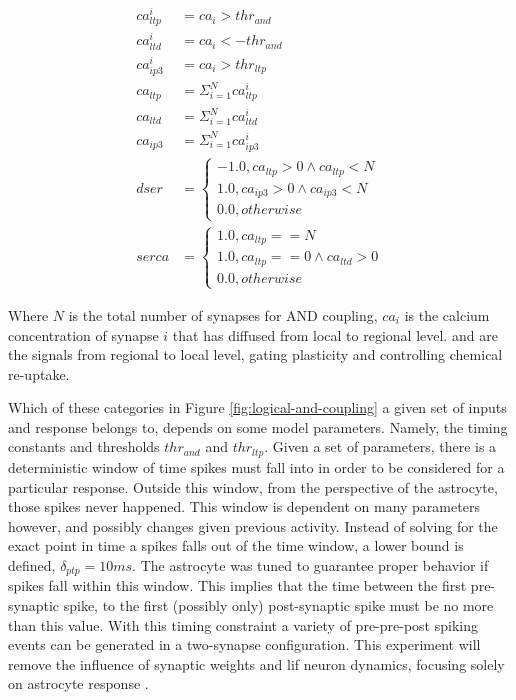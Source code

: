 \begin{align}
  ca^i_{ltp} &= ca_i > thr_{and} \label{eq:ca_and_ltp} \\
  ca^i_{ltd} &= ca_i < -thr_{and} \\
  ca^i_{ip3} &= ca_i > thr_{ltp} \\
  ca_{ltp} &= \Sigma_{i=1}^N ca_{ltp}^i \\
  ca_{ltd} &= \Sigma_{i=1}^N ca_{ltd}^i \\
  ca_{ip3} &= \Sigma_{i=1}^N ca_{ip3}^i \\
  dser &=
  \begin{cases} 
    -1.0, ca_{ltp} > 0 \land ca_{ltp} < N \\
    1.0, ca_{ip3} > 0 \land ca_{ip3} < N \\
    0.0, otherwise
  \end{cases} \label{eq:dser_cases} \\
  serca &=
  \begin{cases}
    1.0, ca_{ltp} == N \\
    1.0, ca_{ltp} == 0 \land ca_{ltd} > 0 \\
    0.0, otherwise 
  \end{cases} \label{eq:serca_cases}
\end{align}

Where $N$ is the total number of synapses for AND coupling, $ca_i$ is the
calcium concentration of synapse $i$ that has diffused from local to regional
level. \dser and \serca are the signals from regional to local level, gating
plasticity and controlling chemical re-uptake.

Which of these categories in Figure \ref{fig:logical-and-coupling} a given set
of inputs and response belongs to, depends on some model parameters. Namely,
the timing constants and thresholds $thr_{and}$ and $thr_{ltp}$. Given a
set of parameters, there is a deterministic window of time spikes must fall into
in order to be considered for a particular response. Outside this window, from
the perspective of the astrocyte, those spikes never happened. This window is
dependent on many parameters however, and possibly changes given previous
activity. Instead of solving for the exact point in time a spikes falls out of
the time window, a lower bound is defined, $\delta_{ptp}=10ms$. The astrocyte
was tuned to guarantee proper behavior if spikes fall within this
window. This implies that the time between the first pre-synaptic spike, to the
first (possibly only) post-synaptic spike must be no more than this value. With
this timing constraint a variety of pre-pre-post spiking events can be generated
in a two-synapse configuration. This experiment will remove the influence of
synaptic weights and \gls{lif} neuron dynamics, focusing solely on astrocyte
response \ca.

